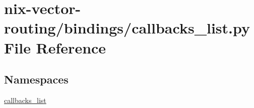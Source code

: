 \hypertarget{nix-vector-routing_2bindings_2callbacks__list_8py}{}\section{nix-\/vector-\/routing/bindings/callbacks\+\_\+list.py File Reference}
\label{nix-vector-routing_2bindings_2callbacks__list_8py}
\subsection*{Namespaces}
\begin{DoxyCompactItemize}
\item 
 \hyperlink{namespacecallbacks__list}{callbacks\+\_\+list}
\end{DoxyCompactItemize}
